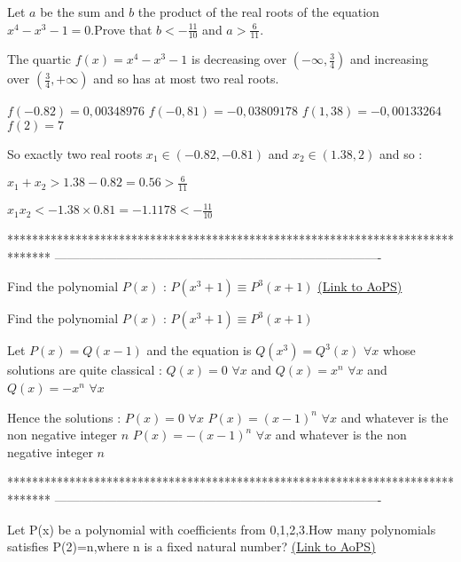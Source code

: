 \begin{solution}
	\begin{tcolorbox}Let $a$ be the sum and $b$ the product of the real roots of the equation $x^4-x^3-1=0$.Prove that $b<-\frac{11}{10}$ and $a>\frac{6}{11}$.\end{tcolorbox}
The quartic $f(x)=x^4-x^3-1$ is decreasing over $(-\infty,\frac 34)$ and increasing over $(\frac 34,+\infty)$ and so has at most two real roots.

$f(-0.82)=0,00348976$
$f(-0,81)=-0,03809178$
$f(1,38)=-0,00133264$
$f(2)=7$

So exactly two real roots $x_1\in(-0.82,-0.81)$ and $x_2\in(1.38,2)$ and so :

$x_1+x_2>1.38-0.82=0.56>\frac 6{11}$

$x_1x_2<-1.38\times 0.81=-1.1178 <-\frac{11}{10}$
\end{solution}
*******************************************************************************
-------------------------------------------------------------------------------

\begin{problem}
	Find the polynomial $P(x)$ : $P(x^3+1)\equiv P^3(x+1)$
	\flushright \href{https://artofproblemsolving.com/community/c6h560845}{(Link to AoPS)}
\end{problem}



\begin{solution}
	\begin{tcolorbox}Find the polynomial $P(x)$ : $P(x^3+1)\equiv P^3(x+1)$\end{tcolorbox}
Let $P(x)=Q(x-1)$ and the equation is $Q(x^3)=Q^3(x)$ $\forall x$ whose solutions are quite classical : $Q(x)=0$ $\forall x$ and $Q(x)=x^n$ $\forall x$ and $Q(x)=-x^n$ $\forall x$

Hence the solutions :
$P(x)=0$ $\forall x$
$P(x)=(x-1)^n$ $\forall x$ and whatever is the non negative integer $n$
$P(x)=-(x-1)^n$ $\forall x$ and whatever is the non negative integer $n$
\end{solution}
*******************************************************************************
-------------------------------------------------------------------------------

\begin{problem}
	Let P(x) be a polynomial with coefficients from {0,1,2,3}.How many polynomials satisfies P(2)=n,where n is a fixed natural number?
	\flushright \href{https://artofproblemsolving.com/community/c6h562437}{(Link to AoPS)}
\end{problem}



